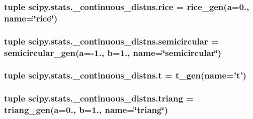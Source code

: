 \subsubsection[{rice}]{\setlength{\rightskip}{0pt plus 5cm}tuple scipy.\+stats.\+\_\+continuous\+\_\+distns.\+rice = {\bf rice\+\_\+gen}({\bf a}=0., name=\char`\"{}rice\char`\"{})}\label{namespacescipy_1_1stats_1_1__continuous__distns_a91903d22ca3810712484d714c6051f91}
\hypertarget{namespacescipy_1_1stats_1_1__continuous__distns_a0e354328286e5c30734a337139736e68}{}
\subsubsection[{semicircular}]{\setlength{\rightskip}{0pt plus 5cm}tuple scipy.\+stats.\+\_\+continuous\+\_\+distns.\+semicircular = {\bf semicircular\+\_\+gen}({\bf a}=-\/1., {\bf b}=1., name=\char`\"{}semicircular\char`\"{})}\label{namespacescipy_1_1stats_1_1__continuous__distns_a0e354328286e5c30734a337139736e68}
\hypertarget{namespacescipy_1_1stats_1_1__continuous__distns_a18a741b517a4ea05b2506252c68495c5}{}
\subsubsection[{t}]{\setlength{\rightskip}{0pt plus 5cm}tuple scipy.\+stats.\+\_\+continuous\+\_\+distns.\+t = {\bf t\+\_\+gen}(name='t')}\label{namespacescipy_1_1stats_1_1__continuous__distns_a18a741b517a4ea05b2506252c68495c5}
\hypertarget{namespacescipy_1_1stats_1_1__continuous__distns_a6cd5fd6e2228656871a90bd2ceef9843}{}
\subsubsection[{triang}]{\setlength{\rightskip}{0pt plus 5cm}tuple scipy.\+stats.\+\_\+continuous\+\_\+distns.\+triang = {\bf triang\+\_\+gen}({\bf a}=0., {\bf b}=1., name=\char`\"{}triang\char`\"{})}\label{namespacescipy_1_1stats_1_1__continuous__distns_a6cd5fd6e2228656871a90bd2ceef9843}
\hypertarget{namespacescipy_1_1stats_1_1__continuous__distns_ab888ce99139533dc32435fdb97e0baa1}{}
